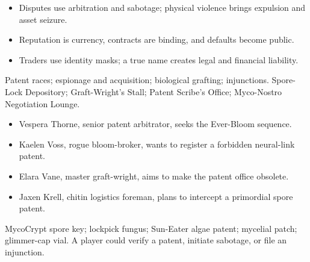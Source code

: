 \documentclass[10pt]{article}
\begin{document}
\begin{minipage}[t]{0.48\linewidth}
\begin{itemize}
\item Disputes use arbitration and sabotage; physical violence brings expulsion and asset seizure.
\item Reputation is currency, contracts are binding, and defaults become public.
\item Traders use identity masks; a true name creates legal and financial liability.
\end{itemize}
Patent races; espionage and acquisition; biological grafting; injunctions.
Spore-Lock Depository; Graft-Wright's Stall; Patent Scribe's Office; Myco-Nostro Negotiation Lounge.
\end{minipage}\hfill
\begin{minipage}[t]{0.48\linewidth}
\begin{itemize}
\item Vespera Thorne, senior patent arbitrator, seeks the Ever-Bloom sequence.
\item Kaelen Voss, rogue bloom-broker, wants to register a forbidden neural-link patent.
\item Elara Vane, master graft-wright, aims to make the patent office obsolete.
\item Jaxen Krell, chitin logistics foreman, plans to intercept a primordial spore patent.
\end{itemize}
MycoCrypt spore key; lockpick fungus; Sun-Eater algae patent; mycelial patch; glimmer-cap vial. A player could verify a patent, initiate sabotage, or file an injunction.
\end{minipage}
\end{document}
